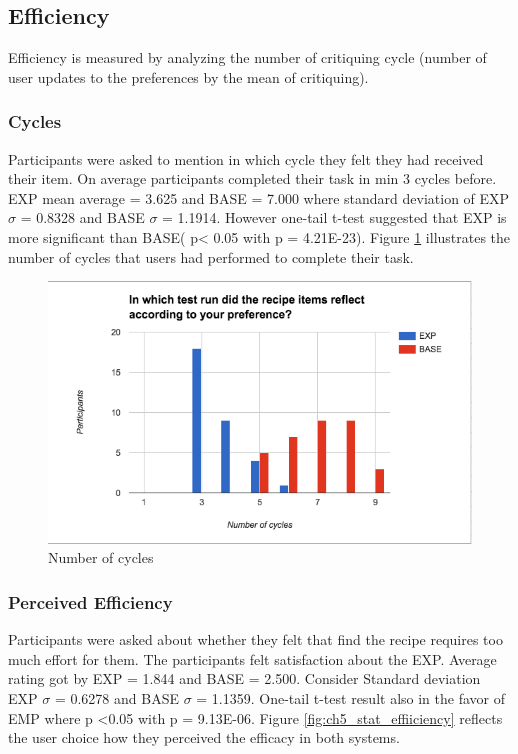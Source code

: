 \subsection{Efficiency}

Efficiency is measured by analyzing the number of critiquing cycle (number of user updates to the preferences by the mean of critiquing). 

\subsubsection{Cycles}
Participants were asked to mention in which cycle they felt they had received their item.  On average participants completed their task in min 3 cycles before.  EXP mean average = 3.625
 and BASE  = 7.000 where standard deviation of EXP ${\sigma}$ = 0.8328 and BASE ${\sigma}$ = 1.1914. However one-tail t-test suggested that EXP is more significant than BASE( p< 0.05 with p =  4.21E-23). Figure \ref{fig:ch5_stat_efficiency_cycles} illustrates the number of cycles that users had performed to complete their task. 

\begin{figure}[h]
	\centering
	\includegraphics[width= 1\linewidth]{figures/ch5_stat_efficiency_cycles}
	\caption{Number of cycles}
	\label{fig:ch5_stat_efficiency_cycles}
\end{figure}

\newpage
\subsubsection{Perceived Efficiency}

Participants were asked about whether they felt that find the recipe requires too much effort for them. The participants felt satisfaction about the EXP. Average rating got by EXP = 1.844 and BASE = 2.500. Consider Standard deviation EXP ${\sigma}$ = 0.6278 and BASE ${\sigma}$ = 1.1359. One-tail t-test result also in the favor of EMP where p <0.05 with p = 9.13E-06. Figure \ref{fig:ch5_stat_effiiciency} reflects the user choice how they perceived the efficacy in both systems.

